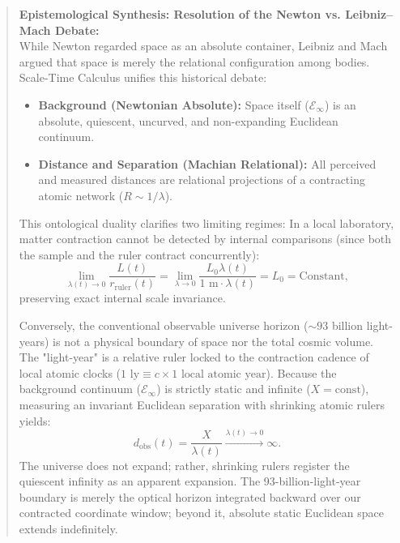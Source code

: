 \begin{quote}
    \small
    \textbf{Epistemological Synthesis: Resolution of the Newton vs. Leibniz--Mach Debate:} \\
    While Newton regarded space as an absolute container, Leibniz and Mach argued that space is merely the relational configuration among bodies. Scale-Time Calculus unifies this historical debate:
    \begin{itemize}
        \item \textbf{Background (Newtonian Absolute):} Space itself ($\mathcal{E}_\infty$) is an absolute, quiescent, uncurved, and non-expanding Euclidean continuum.
        \item \textbf{Distance and Separation (Machian Relational):} All perceived and measured distances are relational projections of a contracting atomic network ($R \sim 1/\lambda$).
    \end{itemize}
    This ontological duality clarifies two limiting regimes: In a local laboratory, matter contraction cannot be detected by internal comparisons (since both the sample and the ruler contract concurrently):
    \begin{equation}
        \lim_{\lambda(t) \to 0} \frac{L(t)}{r_{\mathrm{ruler}}(t)} = \lim_{\lambda \to 0} \frac{L_0 \lambda(t)}{1\text{ m} \cdot \lambda(t)} = L_0 = \text{Constant},
        \label{eq:lhopital_oran_monograph}
    \end{equation}
    preserving exact internal scale invariance.

    Conversely, the conventional observable universe horizon ($\sim 93$ billion light-years) is not a physical boundary of space nor the total cosmic volume. The "light-year" is a relative ruler locked to the contraction cadence of local atomic clocks ($1\text{ ly} \equiv c \times 1\text{ local atomic year}$). Because the background continuum ($\mathcal{E}_\infty$) is strictly static and infinite ($X = \text{const}$), measuring an invariant Euclidean separation with shrinking atomic rulers yields:
    \begin{equation}
        d_{\mathrm{obs}}(t) = \frac{X}{\lambda(t)} \xrightarrow{\lambda(t) \to 0} \infty.
        \label{eq:sonsuz_arka_plan_iraksama_monograph}
    \end{equation}
    The universe does not expand; rather, shrinking rulers register the quiescent infinity as an apparent expansion. The 93-billion-light-year boundary is merely the optical horizon integrated backward over our contracted coordinate window; beyond it, absolute static Euclidean space extends indefinitely.
\end{quote}

